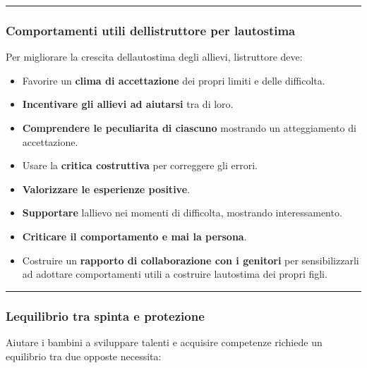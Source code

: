 \documentclass[a4paper,11pt]{article}
\providecommand{\tightlist}{%
  \setlength{\itemsep}{0pt}\setlength{\parskip}{0pt}}
\begin{document}
\begin{center}\rule{0.5\linewidth}{0.5pt}\end{center}

\subsubsection{Comportamenti utili dell\textquotesingle istruttore per
      l\textquotesingle autostima}\label{comportamenti-utili-dellistruttore-per-lautostima}

Per migliorare la crescita dell\textquotesingle autostima degli allievi,
l\textquotesingle istruttore deve:

\begin{itemize}
      \tightlist
      \item
            Favorire un \textbf{clima di accettazione} dei propri limiti e delle
            difficolta.
      \item
            \textbf{Incentivare gli allievi ad aiutarsi} tra di loro.
      \item
            \textbf{Comprendere le peculiarita di ciascuno} mostrando un
            atteggiamento di accettazione.
      \item
            Usare la \textbf{critica costruttiva} per correggere gli errori.
      \item
            \textbf{Valorizzare le esperienze positive}.
      \item
            \textbf{Supportare} l\textquotesingle allievo nei momenti di
            difficolta, mostrando interessamento.
      \item
            \textbf{Criticare il comportamento e mai la persona}.
      \item
            Costruire un \textbf{rapporto di collaborazione con i genitori} per
            sensibilizzarli ad adottare comportamenti utili a costruire
            l\textquotesingle autostima dei propri figli.
\end{itemize}

\begin{center}\rule{0.5\linewidth}{0.5pt}\end{center}

\subsubsection{L\textquotesingle equilibrio tra spinta e
      protezione}\label{lequilibrio-tra-spinta-e-protezione}

Aiutare i bambini a sviluppare talenti e acquisire competenze richiede
un equilibrio tra due opposte necessita:
\end{document}

